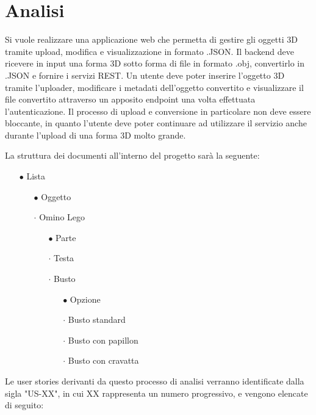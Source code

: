 \section{Analisi}
Si vuole realizzare una applicazione web che permetta di gestire gli oggetti 3D tramite upload, modifica e visualizzazione in formato .JSON.
Il backend deve ricevere in input una forma 3D sotto forma di file in formato .obj, convertirlo in .JSON e fornire i servizi REST\cite{rest}.
Un utente deve poter inserire l'oggetto 3D tramite l'uploader, modificare i metadati dell'oggetto convertito e visualizzare il file convertito attraverso un apposito endpoint una volta effettuata l'autenticazione.
Il processo di upload e conversione in particolare non deve essere bloccante, in quanto l'utente deve poter continuare ad utilizzare il servizio anche durante l'upload di una forma 3D molto grande.

La struttura dei documenti all'interno del progetto sarà la seguente:
\begin{itemize}
	\item[$\bullet$] Lista
	\begin{itemize}
		\item[$\bullet$] Oggetto
		\item[$\cdot$] Omino Lego
		\begin{itemize}
			\item[$\bullet$] Parte
			\item[$\cdot$] Testa
			\item[$\cdot$] Busto
			\begin{itemize}
				\item[$\bullet$] Opzione
				\item[$\cdot$] Busto standard
				\item[$\cdot$] Busto con papillon
				\item[$\cdot$] Busto con cravatta
			\end{itemize}
		\end{itemize}
	\end{itemize}
\end{itemize}

Le user stories derivanti da questo processo di analisi verranno identificate dalla sigla "US-XX", in cui XX rappresenta un numero progressivo, e vengono elencate di seguito:

